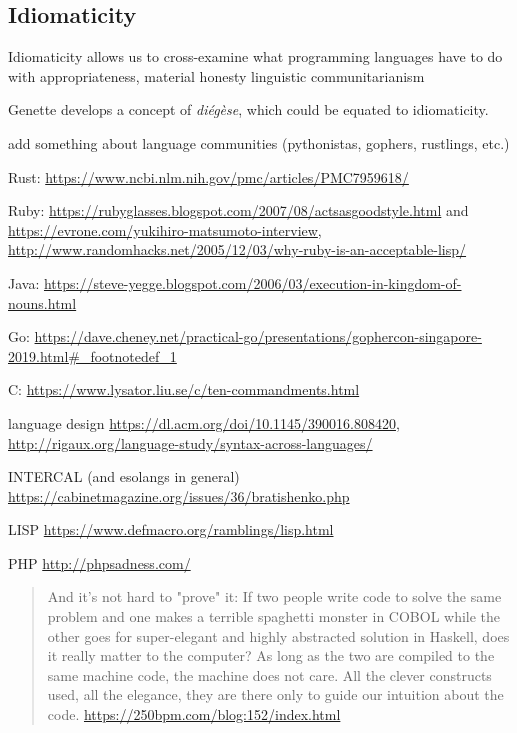 \subsection{Idiomaticity} %
\label{subsec:idiomaticity}




Idiomaticity allows us to cross-examine what programming languages have to do with appropriateness, material honesty linguistic communitarianism

Genette develops a concept of \emph{diégèse}, which could be equated to idiomaticity.

add something about language communities (pythonistas, gophers, rustlings, etc.)

Rust: \url{https://www.ncbi.nlm.nih.gov/pmc/articles/PMC7959618/}

Ruby: \url{https://rubyglasses.blogspot.com/2007/08/actsasgoodstyle.html} and \url{https://evrone.com/yukihiro-matsumoto-interview}, \url{http://www.randomhacks.net/2005/12/03/why-ruby-is-an-acceptable-lisp/}

Java: \url{https://steve-yegge.blogspot.com/2006/03/execution-in-kingdom-of-nouns.html}

Go: \url{https://dave.cheney.net/practical-go/presentations/gophercon-singapore-2019.html#_footnotedef_1}

C: \url{https://www.lysator.liu.se/c/ten-commandments.html}

language design \url{https://dl.acm.org/doi/10.1145/390016.808420}, \url{http://rigaux.org/language-study/syntax-across-languages/}

INTERCAL (and esolangs in general) \url{https://cabinetmagazine.org/issues/36/bratishenko.php}

LISP \url{https://www.defmacro.org/ramblings/lisp.html}

PHP \url{http://phpsadness.com/}

\begin{quote}
  And it's not hard to "prove" it: If two people write code to solve the same problem and one makes a terrible spaghetti monster in COBOL while the other goes for super-elegant and highly abstracted solution in Haskell, does it really matter to the computer? As long as the two are compiled to the same machine code, the machine does not care. All the clever constructs used, all the elegance, they are there only to guide our intuition about the code. \url{https://250bpm.com/blog:152/index.html}
\end{quote}

